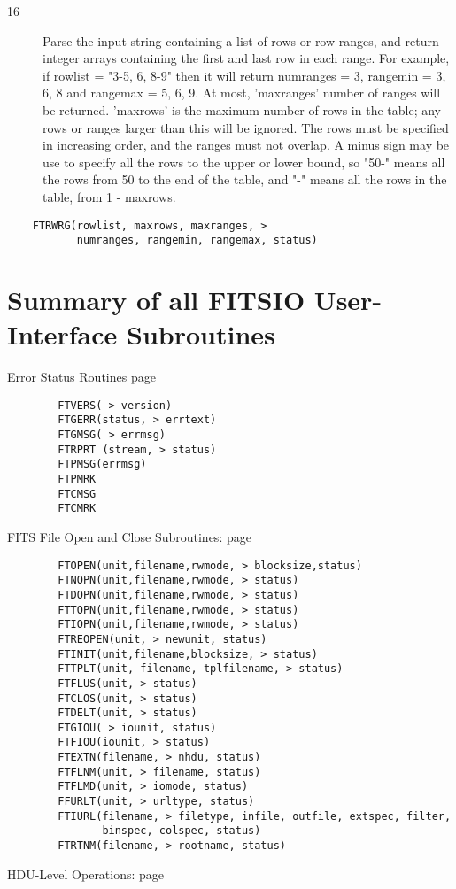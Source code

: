 \documentclass[11pt]{book}
\begin{document}
\begin{description}
\item[16]  Parse the input string containing a list of rows or row ranges, and
     return integer arrays containing the first and last row in each
     range.  For example, if rowlist = "3-5, 6, 8-9" then it will
     return numranges = 3, rangemin = 3, 6, 8 and rangemax = 5, 6, 9.
     At most, 'maxranges' number of ranges will be returned.  'maxrows'
     is the maximum number of rows in the table; any rows or ranges
     larger than this will be ignored.  The rows must be specified in
     increasing order, and the ranges must not overlap. A minus sign
     may be use to specify all the rows to the upper or lower bound, so
     "50-" means all the rows from 50 to the end of the table, and "-"
    means all the rows in the table, from 1 - maxrows.
\end{description}

\begin{verbatim}
    FTRWRG(rowlist, maxrows, maxranges, >
           numranges, rangemin, rangemax, status)
\end{verbatim}


\chapter{  Summary of all FITSIO User-Interface Subroutines }

 Error Status Routines  page~\pageref{FTVERS}

\begin{verbatim}
        FTVERS( > version)
        FTGERR(status, > errtext)
        FTGMSG( > errmsg)
        FTRPRT (stream, > status)
        FTPMSG(errmsg)
        FTPMRK
        FTCMSG
        FTCMRK
\end{verbatim}
 FITS File Open and Close Subroutines: page~\pageref{FTOPEN}

\begin{verbatim}
        FTOPEN(unit,filename,rwmode, > blocksize,status)
        FTNOPN(unit,filename,rwmode, > status)
        FTDOPN(unit,filename,rwmode, > status)
        FTTOPN(unit,filename,rwmode, > status)
        FTIOPN(unit,filename,rwmode, > status)
        FTREOPEN(unit, > newunit, status)
        FTINIT(unit,filename,blocksize, > status)
        FTTPLT(unit, filename, tplfilename, > status)
        FTFLUS(unit, > status)
        FTCLOS(unit, > status)
        FTDELT(unit, > status)
        FTGIOU( > iounit, status)
        FTFIOU(iounit, > status)
        FTEXTN(filename, > nhdu, status)
        FTFLNM(unit, > filename, status)
        FTFLMD(unit, > iomode, status)
        FFURLT(unit, > urltype, status)
        FTIURL(filename, > filetype, infile, outfile, extspec, filter,
               binspec, colspec, status)
        FTRTNM(filename, > rootname, status)
\end{verbatim}
 HDU-Level Operations: page~\pageref{FTMAHD}
\end{document}
